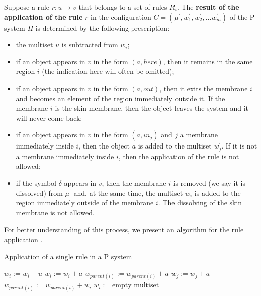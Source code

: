 \begin{definition}
  Suppose a rule $r: u\rightarrow v$ that belongs to a set of rules $R_i$.
  The {\bf result of the application of the rule} $r$ in the configuration $C = (\mu^\prime, w^\prime_1,w^\prime_2,\ldots w^\prime_m)$ of the P system $\Pi$ is determined by the following prescription:
  \begin{itemize}
    \item the multiset $u$ is subtracted from $w_i$;
    \item if an object appears in $v$ in the form $(a, here)$, then it remains in the same region $i$ (the indication here will often be omitted);
    \item if an object appears in $v$ in the form $(a, out)$, then it exits the membrane $i$ and becomes an element of the region immediately outside it. If the membrane $i$ is the skin membrane, then the object leaves the system and it will never come back;
    \item if an object appears in $v$ in the form $(a,in_j)$ and $j$ a membrane immediately inside $i$, then the object $a$ is added to the multiset $w^\prime_j$. If it is not a membrane immediately inside $i$, then the application of the rule is not allowed;
    \item if the symbol $\delta$ appears in $v$, then the membrane $i$ is removed (we say it is dissolved) from $\mu^\prime$ and, at the same time, the multiset $w^\prime_i$ is added to the region immediately outside of the membrane $i$. The dissolving of the skin membrane is not allowed.
  \end{itemize}
\end{definition}

For better understanding of this process, we present an algorithm for the rule application .

\begin{algorithm}
  \caption{Application of a single rule in a P system}\label{alg:application_of_a_rule_in_a_p_system}
  \begin{algorithmic}[1]
      \State $w_i := w_i - u$
        \State $w_i := w_i + a$
      \EndFor
        \State $w_{parent(i)} := w_{parent(i)} + a$
      \EndFor
        \State $w_j := w_j + a$
      \EndFor
        \State $w_{parent(i)} := w_{parent(i)} + w_i$
        \State $w_i := \text{empty multiset}$
      \EndIf
    \EndProcedure
  \end{algorithmic}
\end{algorithm}

